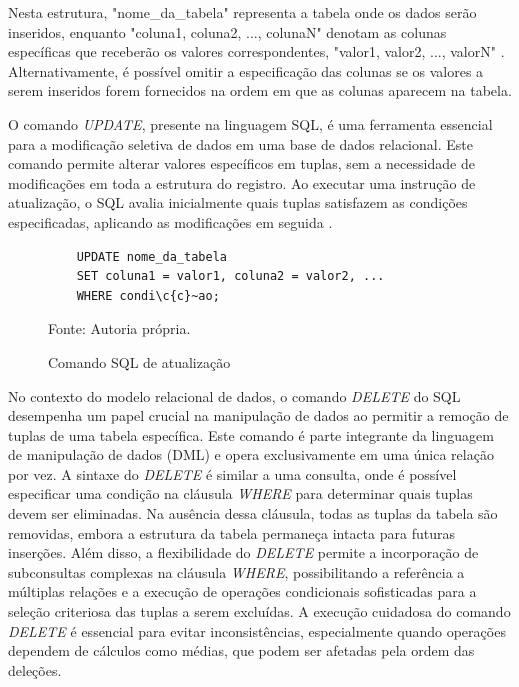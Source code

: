Nesta estrutura, "nome\_da\_tabela" representa a tabela onde os dados serão inseridos, enquanto "coluna1, coluna2, ..., colunaN" denotam as colunas específicas que receberão os valores correspondentes, "valor1, valor2, ..., valorN" \cite{silberschatz2011database}. Alternativamente, é possível omitir a especificação das colunas se os valores a serem inseridos forem fornecidos na ordem em que as colunas aparecem na tabela.


O comando \textit{UPDATE}, presente na linguagem SQL, é uma ferramenta essencial para a modificação seletiva de dados em uma base de dados relacional. Este comando permite alterar valores específicos em tuplas, sem a necessidade de modificações em toda a estrutura do registro. Ao executar uma instrução de atualização, o SQL avalia inicialmente quais tuplas satisfazem as condições especificadas, aplicando as modificações em seguida \cite{silberschatz2011database}.

\begin{figure}[H]
    \centering
    \begin{lstlisting}
    UPDATE nome_da_tabela
    SET coluna1 = valor1, coluna2 = valor2, ...
    WHERE condi\c{c}~ao;
    \end{lstlisting}
    \caption{Comando SQL de atualização}
    Fonte: Autoria própria.
    \label{lst:update}
\end{figure}



No contexto do modelo relacional de dados, o comando \textit{DELETE} do SQL desempenha um papel crucial na manipulação de dados ao permitir a remoção de tuplas de uma tabela específica. Este comando é parte integrante da linguagem de manipulação de dados (DML) e opera exclusivamente em uma única relação por vez. A sintaxe do \textit{DELETE} é similar a uma consulta, onde é possível especificar uma condição na cláusula \textit{WHERE} para determinar quais tuplas devem ser eliminadas. Na ausência dessa cláusula, todas as tuplas da tabela são removidas, embora a estrutura da tabela permaneça intacta para futuras inserções. Além disso, a flexibilidade do \textit{DELETE} permite a incorporação de subconsultas complexas na cláusula \textit{WHERE}, possibilitando a referência a múltiplas relações e a execução de operações condicionais sofisticadas para a seleção criteriosa das tuplas a serem excluídas. A execução cuidadosa do comando \textit{DELETE} é essencial para evitar inconsistências, especialmente quando operações dependem de cálculos como médias, que podem ser afetadas pela ordem das deleções\cite{silberschatz2011database}.

